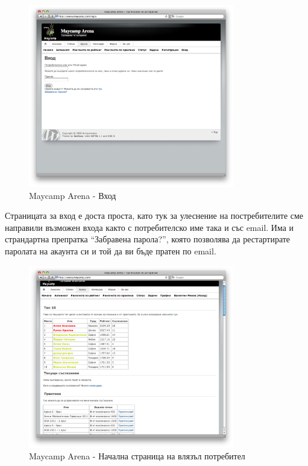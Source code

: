 \documentclass[a4paper,12pt]{article}
\begin{document}
  \begin{figure}[ht]
    \begin{center}
      \includegraphics[width=0.8\textwidth]{maycamp_arena_login.png}
    \end{center}
    \caption{Maycamp Arena - Вход}
    \label{arena_login}
  \end{figure}
  
  Страницата за вход е доста проста, като тук за улеснение на постребителите сме направили възможен входа както с потребителско име така и със email. Има и страндартна препратка ``Забравена парола?'', която позволява да рестартирате паролата на акаунта си и той да ви бъде пратен по email.
  
  \begin{figure}[ht]
    \begin{center}
      \includegraphics[width=0.8\textwidth]{maycamp_arena_home_logged.png}
    \end{center}
    \caption{Maycamp Arena - Начална страница на влязъл потребител}
    \label{arena_homepage_logged}
  \end{figure}
  
\end{document}
